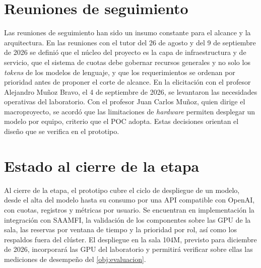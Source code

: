 \section{Reuniones de seguimiento}\label{sec:avance-reuniones}

Las reuniones de seguimiento han sido un insumo constante para el alcance y la arquitectura. En las reuniones con el tutor del 26 de agosto y del 9 de septiembre de 2026 se definió que el núcleo del proyecto es la capa de infraestructura y de servicio, que el sistema de cuotas debe gobernar recursos generales y no solo los \emph{tokens} de los modelos de lenguaje, y que los requerimientos se ordenan por prioridad antes de proponer el corte de alcance. En la elicitación con el profesor Alejandro Muñoz Bravo, el 4 de septiembre de 2026, se levantaron las necesidades operativas del laboratorio. Con el profesor Juan Carlos Muñoz, quien dirige el macroproyecto, se acordó que las limitaciones de \emph{hardware} permiten desplegar un modelo por equipo, criterio que el POC adopta. Estas decisiones orientan el diseño que se verifica en el prototipo.

\section{Estado al cierre de la etapa}\label{sec:avance-estado}

Al cierre de la etapa, el prototipo cubre el ciclo de despliegue de un modelo, desde el alta del modelo hasta su consumo por una API compatible con OpenAI, con cuotas, registros y métricas por usuario. Se encuentran en implementación la integración con SAAMFI, la validación de los componentes sobre las GPU de la sala, las reservas por ventana de tiempo y la prioridad por rol, así como los respaldos fuera del clúster. El despliegue en la sala 104M, previsto para diciembre de 2026, incorporará las GPU del laboratorio y permitirá verificar sobre ellas las mediciones de desempeño del \cref{obj:evaluacion}.
